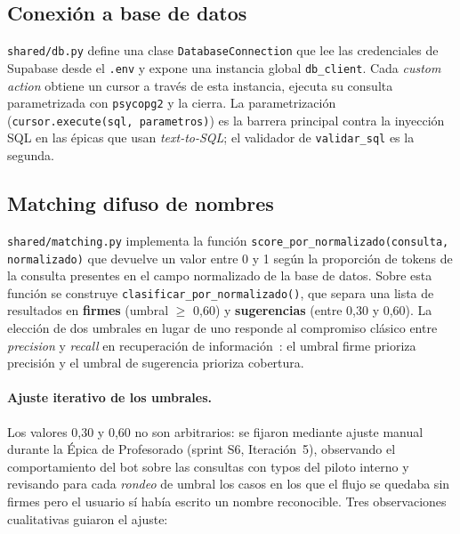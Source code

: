 \subsection{Conexión a base de datos}

\texttt{shared/db.py} define una clase \texttt{DatabaseConnection} que lee las credenciales de Supabase desde el \texttt{.env} y expone una instancia global \texttt{db\_client}. Cada \textit{custom action} obtiene un cursor a través de esta instancia, ejecuta su consulta parametrizada con \texttt{psycopg2} y la cierra. La parametrización (\texttt{cursor.execute(sql, parametros)}) es la barrera principal contra la inyección SQL en las épicas que usan \textit{text-to-SQL}; el validador de \texttt{validar\_sql} es la segunda.

\subsection{Matching difuso de nombres}

\texttt{shared/matching.py} implementa la función \texttt{score\_por\_normalizado(consulta, normalizado)} que devuelve un valor entre 0 y 1 según la proporción de tokens de la consulta presentes en el campo normalizado de la base de datos. Sobre esta función se construye \texttt{clasificar\_por\_normalizado()}, que separa una lista de resultados en \textbf{firmes} (umbral $\geq$ 0,60) y \textbf{sugerencias} (entre 0,30 y 0,60). La elección de dos umbrales en lugar de uno responde al compromiso clásico entre \textit{precision} y \textit{recall} en recuperación de información~\cite{manning2008introduction}: el umbral firme prioriza precisión y el umbral de sugerencia prioriza cobertura.

\paragraph{Ajuste iterativo de los umbrales.} Los valores 0,30 y 0,60 no son arbitrarios: se fijaron mediante ajuste manual durante la Épica de Profesorado (sprint S6, Iteración~5), observando el comportamiento del bot sobre las consultas con typos del piloto interno y revisando para cada \textit{rondeo} de umbral los casos en los que el flujo se quedaba sin firmes pero el usuario sí había escrito un nombre reconocible. Tres observaciones cualitativas guiaron el ajuste:

